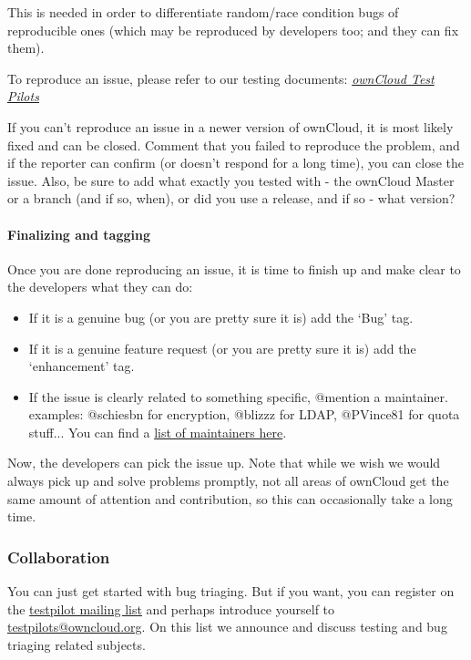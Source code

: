 \documentclass[letterpaper,10pt,english]{sphinxmanual}
\begin{document}
This is needed in order to differentiate random/race condition bugs of reproducible ones (which may be reproduced by developers too; and they can fix them).

To reproduce an issue, please refer to our testing documents: {\hyperref[testing/index::doc]{\emph{ownCloud Test Pilots}}}

If you can't reproduce an issue in a newer version of ownCloud, it is most likely fixed and can be closed. Comment that you failed to reproduce the problem, and if the reporter can confirm (or doesn't respond for a long time), you can close the issue. Also, be sure to add what exactly you tested with - the ownCloud Master or a branch (and if so, when), or did you use a release, and if so - what version?


\paragraph{Finalizing and tagging}
\label{bugtracker/triaging:finalizing-and-tagging}
Once you are done reproducing an issue, it is time to finish up and make clear to the developers what they can do:
\begin{itemize}
\item {} 
If it is a genuine bug (or you are pretty sure it is) add the `Bug' tag.

\item {} 
If it is a genuine feature request (or you are pretty sure it is) add the `enhancement' tag.

\item {} 
If the issue is clearly related to something specific, @mention a maintainer. examples: @schiesbn for encryption, @blizzz for LDAP, @PVince81 for quota stuff... You can find a \href{https://github.com/owncloud/core/wiki/Maintainers}{list of maintainers here}.

\end{itemize}

Now, the developers can pick the issue up. Note that while we wish we would always pick up and solve problems promptly, not all areas of ownCloud get the same amount of attention and contribution, so this can occasionally take a long time.


\subsubsection{Collaboration}
\label{bugtracker/triaging:collaboration}
You can just get started with bug triaging. But if you want, you can register on the \href{https://mailman.owncloud.org/mailman/listinfo/testpilots}{testpilot mailing list} and perhaps introduce yourself to \href{mailto:testpilots@owncloud.org}{testpilots@owncloud.org}. On this list we announce and discuss testing and bug triaging related subjects.
\end{document}
